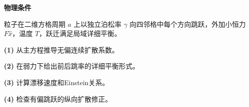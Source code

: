 \textbf{物理条件}\par 粒子在二维方格周期 \(a\) 上以独立泊松率 \(\gamma\) 向四邻格中每个方向跳跃，外加小恒力 \(F\hat x\)，温度 \(T\)，跃迁满足局域详细平衡。
\par\noindent\textbf{(1)} 从主方程推导无偏连续扩散系数。
\par\noindent\textbf{(2)} 在弱力下给出前后跳率的详细平衡形式。
\par\noindent\textbf{(3)} 计算漂移速度和Einstein关系。
\par\noindent\textbf{(4)} 检查有偏跳跃的纵向扩散修正。
